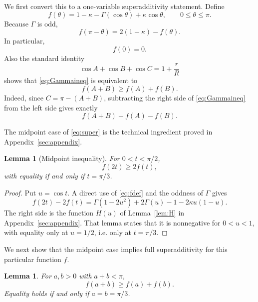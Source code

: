 \documentclass[11pt]{article}
\newtheorem{lemma}[theorem]{Lemma}
\theoremstyle{definition}
\theoremstyle{remark}
\begin{document}
We first convert this to a one-variable superadditivity statement.  Define
\begin{equation}
\label{eq:fdef}
f(\theta)
=
1-\kappa-\Gamma(\cos\theta)+\kappa\cos\theta,
\qquad 0\le\theta\le\pi.
\end{equation}
Because $\Gamma$ is odd,
\begin{equation}
\label{eq:fsym}
f(\pi-\theta)=2(1-\kappa)-f(\theta).
\end{equation}
In particular,
\begin{equation}
\label{eq:fzero}
f(0)=0.
\end{equation}
Also the standard identity
\begin{equation}
\label{eq:cosrho}
\cos A+\cos B+\cos C=1+\frac rR
\end{equation}
shows that \eqref{eq:Gammaineq} is equivalent to
\begin{equation}
\label{eq:super}
f(A+B)\ge f(A)+f(B).
\end{equation}
Indeed, since $C=\pi-(A+B)$, subtracting the right side of \eqref{eq:Gammaineq} from the left side gives exactly
\[
f(A+B)-f(A)-f(B).
\]

The midpoint case of \eqref{eq:super} is the technical ingredient proved in Appendix~\ref{sec:appendix}.

\begin{lemma}[Midpoint inequality]
\label{lem:midpoint}
For $0<t<\pi/2$,
\begin{equation}
\label{eq:midpoint}
f(2t)\ge2f(t),
\end{equation}
with equality if and only if $t=\pi/3$.
\end{lemma}

\begin{proof}
Put $u=\cos t$.  A direct use of \eqref{eq:fdef} and the oddness of $\Gamma$ gives
\[
f(2t)-2f(t)
=
\Gamma(1-2u^2)+2\Gamma(u)-1-2\kappa u(1-u).
\]
The right side is the function $H(u)$ of Lemma~\ref{lem:H} in Appendix~\ref{sec:appendix}.  That lemma states that it is nonnegative for $0<u<1$, with equality only at $u=1/2$, i.e. only at $t=\pi/3$.
\end{proof}

We next show that the midpoint case implies full superadditivity for this particular function $f$.

\begin{lemma}
\label{lem:superadd}
For $a,b>0$ with $a+b<\pi$,
\[
f(a+b)\ge f(a)+f(b).
\]
Equality holds if and only if $a=b=\pi/3$.
\end{lemma}
\end{document}
